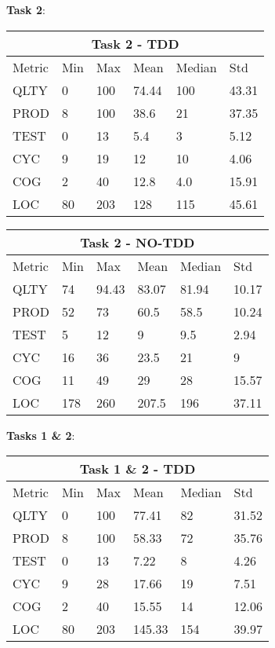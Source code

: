 \textbf{Task 2}:

\noindent
\begin{tabular}{ |p{2cm}||p{1.6cm}|p{1.6cm}|p{1.6cm}|p{1.6cm}|p{1.6cm}|}
    \hline
        \multicolumn{6}{|c|}{Task 2 - TDD} \\
    \hline
        Metric & Min & Max & Mean & Median & Std\\
    \hline
        QLTY & 0 & 100 & 74.44 & 100 & 43.31 \\
        PROD & 8 & 100 & 38.6 & 21 & 37.35 \\
        TEST & 0 & 13 & 5.4 & 3 & 5.12 \\
        CYC & 9 & 19 & 12 & 10 & 4.06 \\
        COG & 2 & 40 & 12.8 & 4.0 & 15.91 \\
        LOC & 80 & 203 & 128 & 115 & 45.61 \\
    \hline
\end{tabular}

\noindent
\begin{tabular}{ |p{2cm}||p{1.6cm}|p{1.6cm}|p{1.6cm}|p{1.6cm}|p{1.6cm}|}
    \hline
        \multicolumn{6}{|c|}{Task 2 - NO-TDD} \\
    \hline
        Metric & Min & Max & Mean & Median & Std\\
    \hline
        QLTY & 74 & 94.43 & 83.07 & 81.94 & 10.17 \\
        PROD & 52 & 73 & 60.5 & 58.5 & 10.24 \\
        TEST & 5 & 12 & 9 & 9.5 & 2.94 \\
        CYC & 16 & 36 & 23.5 & 21 & 9 \\
        COG & 11 & 49 & 29 & 28 & 15.57 \\
        LOC & 178 & 260 & 207.5 & 196 & 37.11 \\
    \hline
\end{tabular}

\textbf{Tasks 1 \& 2}:

\noindent
\begin{tabular}{ |p{2cm}||p{1.6cm}|p{1.6cm}|p{1.6cm}|p{1.6cm}|p{1.6cm}|}
    \hline
        \multicolumn{6}{|c|}{Task 1 \& 2 - TDD} \\
    \hline
        Metric & Min & Max & Mean & Median & Std\\
    \hline
        QLTY & 0 & 100 & 77.41 & 82 & 31.52 \\
        PROD & 8 & 100 & 58.33 & 72 & 35.76 \\
        TEST & 0 & 13 & 7.22 & 8 & 4.26 \\
        CYC & 9 & 28 & 17.66 & 19 & 7.51 \\
        COG & 2 & 40 & 15.55 & 14 & 12.06 \\
        LOC & 80 & 203 & 145.33 & 154 & 39.97 \\
    \hline
\end{tabular}

